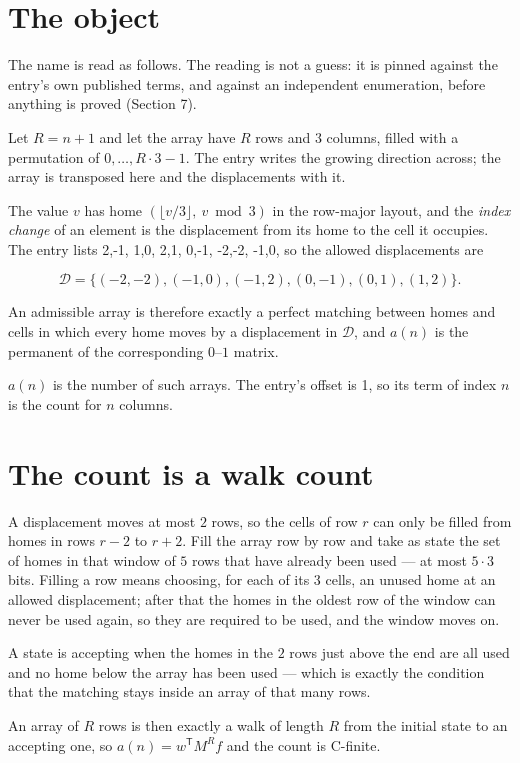 \documentclass[11pt]{article}
\theoremstyle{definition}
\begin{document}
\section{The object}

The name is read as follows. The reading is not a guess: it is pinned against the entry's own published terms, and against an independent enumeration, before anything is proved (Section 7).

Let $R = n + 1$ and let the array have $R$ rows and $3$ columns, filled with a permutation of $0,\dots,R\cdot3-1$. The entry writes the growing direction across; the array is transposed here and the displacements with it.

The value $v$ has home $(\lfloor v/3\rfloor,\ v \bmod 3)$ in the row-major layout, and the {\itshape index change} of an element is the displacement from its home to the cell it occupies. The entry lists 2,-1, 1,0, 2,1, 0,-1, -2,-2, -1,0, so the allowed displacements are

\[\mathcal{D} = \{(-2,-2), (-1,0), (-1,2), (0,-1), (0,1), (1,2)\}.\]

An admissible array is therefore exactly a perfect matching between homes and cells in which every home moves by a displacement in $\mathcal{D}$, and $a(n)$ is the permanent of the corresponding $0$--$1$ matrix.

$a(n)$ is the number of such arrays. The entry's offset is 1, so its term of index $n$ is the count for $n$ columns.

\section{The count is a walk count}

A displacement moves at most $2$ rows, so the cells of row $r$ can only be filled from homes in rows $r-2$ to $r+2$. Fill the array row by row and take as state the set of homes in that window of $5$ rows that have already been used --- at most $5\cdot3$ bits. Filling a row means choosing, for each of its $3$ cells, an unused home at an allowed displacement; after that the homes in the oldest row of the window can never be used again, so they are required to be used, and the window moves on.

A state is accepting when the homes in the $2$ rows just above the end are all used and no home below the array has been used --- which is exactly the condition that the matching stays inside an array of that many rows.

An array of $R$ rows is then exactly a walk of length $R$ from the initial state to an accepting one, so $a(n) = w^{\mathsf T}M^{R}f$ and the count is C-finite.
\end{document}
